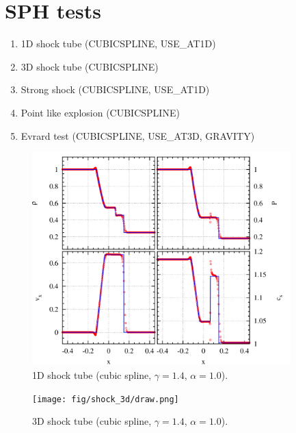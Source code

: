 \documentclass[fleqn,dvipdfmx]{article}
\begin{document}
\section{SPH tests}

\begin{enumerate}
\item 1D shock tube (CUBICSPLINE, USE\_AT1D)
\item 3D shock tube (CUBICSPLINE)
\item Strong shock (CUBICSPLINE, USE\_AT1D)
\item Point like explosion (CUBICSPLINE)
\item Evrard test (CUBICSPLINE, USE\_AT3D, GRAVITY)
\end{enumerate}

\begin{figure}
  \begin{center}
    \includegraphics[width=10cm,bb=0 0 1020 840]{fig/shock_1d/draw.png}
  \end{center}
  \caption{1D shock tube (cubic spline, $\gamma=1.4$, $\alpha=1.0$).}
\end{figure}

\begin{figure}
  \begin{center}
    \texttt{[image: fig/shock\_3d/draw.png]}
  \end{center}
  \caption{3D shock tube (cubic spline, $\gamma=1.4$, $\alpha=1.0$).}
\end{figure}
\end{document}
